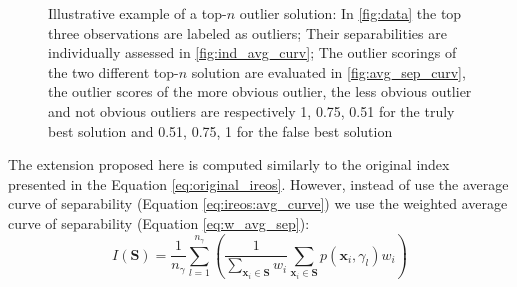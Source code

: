 \begin{figure}[ht!]
\center
{}
\qquad
{}
\qquad
{}
\caption{Illustrative example of a top-$n$ outlier solution: In \ref{fig:data} the top three observations are labeled as outliers; Their separabilities are individually assessed in \ref{fig:ind_avg_curv}; The outlier scorings of the two different top-$n$ solution are evaluated in \ref{fig:avg_sep_curv}, the outlier scores of the more obvious outlier, the less obvious outlier and not obvious outliers are respectively 1, 0.75, 0.51 for the truly best solution and 0.51, 0.75, 1 for the false best solution}
\label{fig:ilustration}
\end{figure}

The extension proposed here is computed similarly to the original index presented in the Equation \ref{eq:original_ireos}. However, instead of use the average curve of separability (Equation \ref{eq:ireos:avg_curve}) we use the weighted average curve of separability (Equation \ref{eq:w_avg_sep}):
\begin{equation}
I(\mathbf{S}) = \frac{1}{n_{\gamma}} \sum_{l = 1}^{n_{\gamma}} \left( \frac{1}{\sum_{\mathbf{x}_i \in \mathbf{S}} w_i} \sum_{\mathbf{x}_i \in \mathbf{S}} p(\mathbf{x}_i, \gamma_l) w_i \right)
\label{eq:ext_ireos}
\end{equation}

